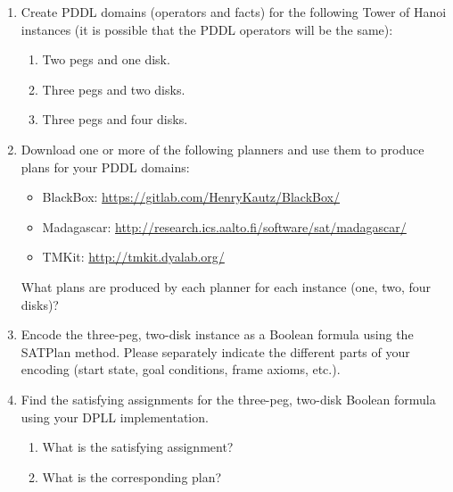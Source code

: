 \documentclass[12pt,letterpaper]{ntdhw}
\begin{document}
\begin{enumerate}
  \item  Create PDDL domains (operators and facts) for the following Tower of
  Hanoi instances (it is possible that the PDDL operators will be the
  same):
  \begin{enumerate}
    \item Two pegs and one disk.
    \item Three pegs and two disks.
    \item Three pegs and four disks.
  \end{enumerate}

  \item  Download one or more of the following planners and use them to
  produce plans for your PDDL domains:
  \begin{itemize}
    \item BlackBox:
    \url{https://gitlab.com/HenryKautz/BlackBox/}
    \item Madagascar:
    \url{http://research.ics.aalto.fi/software/sat/madagascar/}
    \item TMKit:
    \url{http://tmkit.dyalab.org/}
  \end{itemize}
  What plans are produced by each planner for each instance (one, two,
  four disks)?

    \item  Encode the three-peg, two-disk instance as a Boolean formula using the
    SATPlan method.  Please separately indicate the different parts of your
    encoding (start state, goal conditions, frame axioms, etc.).

  \item Find the satisfying assignments for the three-peg, two-disk
    Boolean formula using your DPLL implementation.
    \begin{enumerate}
      \item What is the satisfying assignment?
      \item What is the corresponding plan?
    \end{enumerate}


\end{enumerate}
\end{document}

